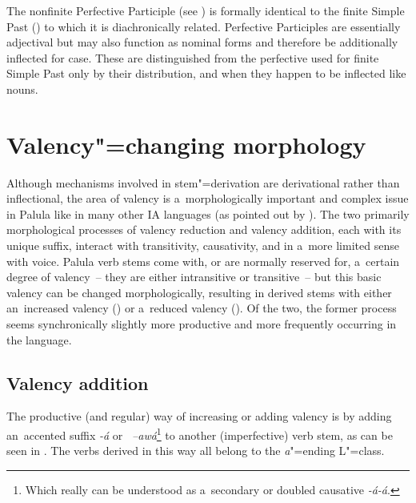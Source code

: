 The nonfinite Perfective Participle (see ) is formally identical to the finite Simple Past () to which it is diachronically related. Perfective Participles are essentially adjectival but may also function as nominal forms and therefore be additionally inflected for case. These are distinguished from the perfective used for finite Simple Past only by their distribution, and when they happen to be inflected like nouns.


\section{Valency"=changing morphology}
\label{sec:8-5}

Although mechanisms involved in stem"=derivation are derivational rather than inflectional, the area of valency is a~morphologically important and complex issue in Palula like in many other IA languages (as pointed out by \citealt[315]{masica1991}). The two primarily morphological processes of valency reduction and valency addition, each with its unique suffix, interact with transitivity, causativity, and in a~more limited sense with voice. Palula verb stems come with, or are normally reserved for, a~certain degree of valency~-- they are either intransitive or transitive~-- but this basic valency can be changed morphologically, resulting in derived stems with either an~increased valency () or a~reduced valency (). Of the two, the former process seems synchronically slightly more productive and more frequently occurring in the language.


\subsection{Valency addition}
\label{subsec:8-5-1}

The productive (and regular) way of increasing or adding valency is by adding an~accented suffix
\textit{-á} or \textit{~--awá}\footnote{Which really can be understood as a~secondary or
  doubled causative \textit{-á-á}.} to another (imperfective) verb stem, as can be seen in
. The verbs derived in this way all belong to the \textit{a}"=ending L"=class.



